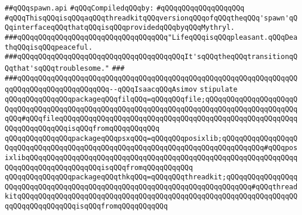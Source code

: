 \label{src/lib/std/src/posix/spawn.api}
\verb|##qQQqspawn.api|\newline
\newline
\verb|#qQQqCompiledqQQqby:|\newline
\verb|#qQQqqQQqqQQqqQQqqQQq|\newline
\newline
\newline
\newline
\verb|#qQQqThisqQQqisqQQqaqQQqthreadkitqQQqversionqQQqofqQQqtheqQQq'spawn'qQQqinterfaceqQQqthatqQQqisqQQqprovidedqQQqbyqQQqMythryl.|\newline
\newline
\newline
\newline
\verb|###qQQqqQQqqQQqqQQqqQQqqQQqqQQqqQQqqQQq"LifeqQQqisqQQqpleasant.qQQqDeathqQQqisqQQqpeaceful.|\newline
\verb|###qQQqqQQqqQQqqQQqqQQqqQQqqQQqqQQqqQQqqQQqIt'sqQQqtheqQQqtransitionqQQqthat'sqQQqtroublesome."|\newline
\verb|###|\newline
\verb|###qQQqqQQqqQQqqQQqqQQqqQQqqQQqqQQqqQQqqQQqqQQqqQQqqQQqqQQqqQQqqQQqqQQqqQQqqQQqqQQqqQQqqQQqqQQq--qQQqIsaacqQQqAsimov|\newline
\newline
\newline
\verb|stipulate|\newline
\verb|qQQqqQQqqQQqqQQqpackageqQQqfilqQQq=qQQqqQQqfile;qQQqqQQqqQQqqQQqqQQqqQQqqQQqqQQqqQQqqQQqqQQqqQQqqQQqqQQqqQQqqQQqqQQqqQQqqQQqqQQqqQQqqQQqqQQqqQQq#qQQqfileqQQqqQQqqQQqqQQqqQQqqQQqqQQqqQQqqQQqqQQqqQQqqQQqqQQqqQQqqQQqqQQqqQQqqQQqisqQQqfromqQQqqQQqqQQq|\newline
\verb|qQQqqQQqqQQqqQQqpackageqQQqpsxqQQq=qQQqqQQqposixlib;qQQqqQQqqQQqqQQqqQQqqQQqqQQqqQQqqQQqqQQqqQQqqQQqqQQqqQQqqQQqqQQqqQQqqQQqqQQqqQQq#qQQqposixlibqQQqqQQqqQQqqQQqqQQqqQQqqQQqqQQqqQQqqQQqqQQqqQQqqQQqqQQqqQQqqQQqqQQqqQQqqQQqqQQqqQQqqQQqisqQQqfromqQQqqQQqqQQq|\newline
\verb|qQQqqQQqqQQqqQQqpackageqQQqthkqQQq=qQQqqQQqthreadkit;qQQqqQQqqQQqqQQqqQQqqQQqqQQqqQQqqQQqqQQqqQQqqQQqqQQqqQQqqQQqqQQqqQQqqQQqqQQq#qQQqthreadkitqQQqqQQqqQQqqQQqqQQqqQQqqQQqqQQqqQQqqQQqqQQqqQQqqQQqqQQqqQQqqQQqqQQqqQQqqQQqqQQqqQQqisqQQqfromqQQqqQQqqQQq|\newline
